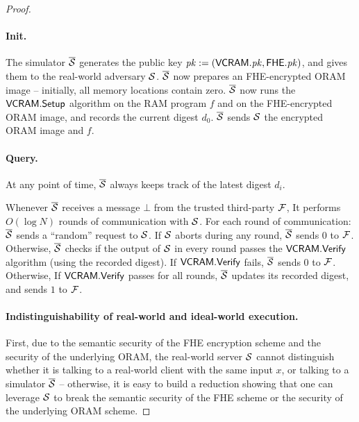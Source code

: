 {\begin{proof}
\paragraph{Init.}
The simulator $\overline{\mathcal{S}}$ generates the public key $\mathit{pk} := (\mathsf{VCRAM}.\mathit{pk}, \mathsf{FHE}.\mathit{pk})$,
and gives them to the real-world adversary $\mathcal{S}$.
$\overline{\mathcal{S}}$ now prepares an FHE-encrypted ORAM image -- initially, all memory locations
contain zero.
$\overline{\mathcal{S}}$ now runs
the $\mathsf{VCRAM}.\mathsf{Setup}$
algorithm on the RAM program $f$ and
on the FHE-encrypted ORAM image,
and records the current digest $d_0$.
$\overline{\mathcal{S}}$ sends $\mathcal{S}$ the encrypted ORAM image and $f$.


\paragraph{Query.}
At any point of time, $\overline{\mathcal{S}}$
always keeps track of the latest digest $d_i$.

Whenever $\overline{\mathcal{S}}$ receives a message $\bot$ from the trusted third-party $\mathcal{F}$,
It performs $O(\log N)$ rounds of communication with $\mathcal{S}$.
For each round of communication:
$\overline{\mathcal{S}}$ sends a ``random'' request to $\mathcal{S}$.
If $\mathcal{S}$ aborts during any round, $\overline{\mathcal{S}}$ sends $0$ to $\mathcal{F}$.
Otherwise,
$\overline{\mathcal{S}}$ checks if the output of $\mathcal{S}$ in every round passes the $\mathsf{VCRAM}.\mathsf{Verify}$
algorithm (using the recorded digest).
If $\mathsf{VCRAM}.\mathsf{Verify}$ fails, $\overline{\mathcal{S}}$ sends $0$ to $\mathcal{F}$.
Otherwise,
If $\mathsf{VCRAM}.\mathsf{Verify}$
passes for all rounds,
$\overline{\mathcal{S}}$ updates its recorded digest, and sends $1$ to $\mathcal{F}$.



\paragraph{Indistinguishability of real-world and ideal-world execution.}
First, due to the semantic security of the FHE encryption scheme
and the security of the underlying ORAM,
the real-world server $\mathcal{S}$ cannot distinguish whether it is talking
to a real-world client with the same input $x$, or talking to a simulator $\overline{\mathcal{S}}$ -- otherwise,
it is easy to build a reduction showing that one can leverage $\mathcal{S}$ to break
the semantic security of the FHE scheme or the security of the underlying ORAM scheme.


\end{proof}}
